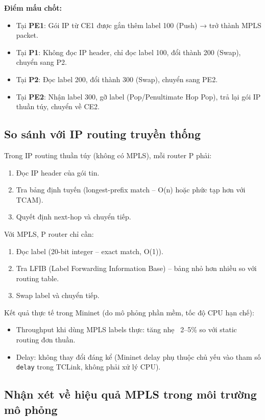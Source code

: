 \textbf{Điểm mấu chốt:}
\begin{itemize}
    \item Tại \textbf{PE1}: Gói IP từ CE1 được gắn thêm label 100 (Push) → trở thành MPLS packet.
    \item Tại \textbf{P1}: Không đọc IP header, chỉ đọc label 100, đổi thành 200 (Swap), chuyển sang P2.
    \item Tại \textbf{P2}: Đọc label 200, đổi thành 300 (Swap), chuyển sang PE2.
    \item Tại \textbf{PE2}: Nhận label 300, gỡ label (Pop/Penultimate Hop Pop), trả lại gói IP thuần túy, chuyển về CE2.
\end{itemize}

\subsection{So sánh với IP routing truyền thống}

Trong IP routing thuần túy (không có MPLS), mỗi router P phải:
\begin{enumerate}
    \item Đọc IP header của gói tin.
    \item Tra bảng định tuyến (longest-prefix match – O(n) hoặc phức tạp hơn với TCAM).
    \item Quyết định next-hop và chuyển tiếp.
\end{enumerate}

Với MPLS, P router chỉ cần:
\begin{enumerate}
    \item Đọc label (20-bit integer – exact match, O(1)).
    \item Tra LFIB (Label Forwarding Information Base) – bảng nhỏ hơn nhiều so với routing table.
    \item Swap label và chuyển tiếp.
\end{enumerate}

Kết quả thực tế trong Mininet (do mô phỏng phần mềm, tốc độ CPU hạn chế):
\begin{itemize}
    \item Throughput khi dùng MPLS labels thực: tăng nhẹ ~2--5\% so với static routing đơn thuần.
    \item Delay: không thay đổi đáng kể (Mininet delay phụ thuộc chủ yếu vào tham số \texttt{delay} trong TCLink, không phải xử lý CPU).
\end{itemize}

\subsection{Nhận xét về hiệu quả MPLS trong môi trường mô phỏng}

